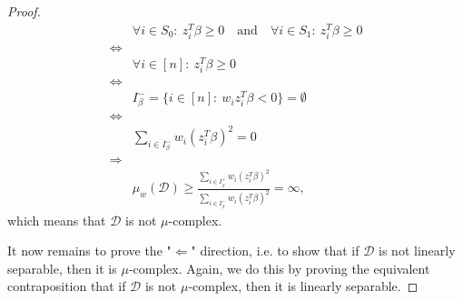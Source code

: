 \begin{proof}
\begin{align*}
                & \forall i \in S_0:\ z_i^T \beta \geq 0\quad \text{and}\quad \forall i \in S_1:\ z_i^T \beta \geq 0                         \\
    \iff        &                                                                                                                            \\
                & \forall i \in [n]:\ z_i^T\beta \geq 0                                                                                      \\
    \iff        &                                                                                                                            \\
                & I_\beta^- = \{ i \in [n]:\ w_iz_i^T\beta < 0\} = \emptyset                                                                 \\
    \iff        &                                                                                                                            \\
                & \sum_{i \in I_\beta^-} w_i (z_i^T \beta)^2 = 0                                                                             \\
    \Rightarrow &                                                                                                                            \\
                & \mu_w(\mathcal{D}) \geq \frac{\sum_{i \in I_\beta^+} w_i (z_i^T \beta)^2}
    {\sum_{i \in I_\beta^-} w_i (z_i^T \beta)^2} = \infty,
\end{align*}
\endgroup
which means that $\mathcal{D}$ is not $\mu$-complex.

It now remains to prove the "$\Leftarrow$" direction, i.e. to
show that if $\mathcal{D}$ is not linearly separable,
then it is $\mu$-complex. Again, we do this by proving the
equivalent contraposition that if $\mathcal{D}$ is not
$\mu$-complex, then it is linearly separable.


\end{proof}
